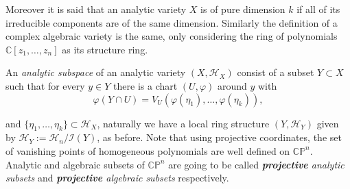 \documentclass[letterpaper]{book}
\newcommand{\co}{\ensuremath{\mathbb C }}
\newcommand{\cp}{\ensuremath{\mathbb{CP}}}
\begin{document}
Moreover it is said that an analytic variety $X$ is of pure dimension $k$ if all of its irreducible components are of the same dimension. Similarly the definition of a complex algebraic variety is the same, only considering the ring of polynomials $\co[z_{1},\dots,z_{n}]$ as its structure ring.

An \emph{analytic subspace} of an analytic variety $(X,\mathcal{H}_{X})$ consist of a subset $Y\subset X$ such that for every $y\in Y$ there is a chart $(U,\varphi)$ around $y$ with
\[
  \varphi(Y\cap U)=V_U(\varphi(\eta_1),\dots,\varphi(\eta_k)),
\]

\noindent and $\lbrace\eta_1,\dots,\eta_k\rbrace\subset\mathcal{H}_{X}$, naturally we have a local ring structure $(Y,\mathcal{H}_{Y})$ given by $\mathcal{H}_Y:=\mathcal{H}_n/\mathcal{I}(Y)$, as before.
Note that using projective coordinates, the set of vanishing points of homogeneous polynomials are well defined on $\cp^n$. Analytic and algebraic subsets of $\cp^n$ are going to be called  \emph{\textbf{projective} analytic subsets} and \emph{\textbf{projective} algebraic subsets} respectively.
\end{document}

